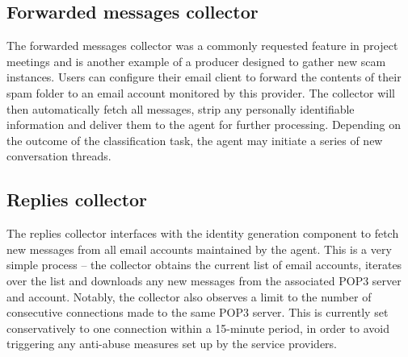 \subsection{Forwarded messages collector}
The forwarded messages collector was a commonly requested feature in project meetings and is another example of a producer designed to gather new scam instances. Users can configure their email client to forward the contents of their spam folder to an email account monitored by this provider. The collector will then automatically fetch all messages, strip any personally identifiable information and deliver them to the agent for further processing. Depending on the outcome of the classification task, the agent may initiate a series of new conversation threads.

\subsection{Replies collector}
The replies collector interfaces with the identity generation component to fetch new messages from all email accounts maintained by the agent. This is a very simple process -- the collector obtains the current list of email accounts, iterates over the list and downloads any new messages from the associated POP3 server and account.  Notably, the collector also observes a limit to the number of consecutive connections made to the same POP3 server. This is currently set conservatively to one connection within a 15-minute period, in order to avoid triggering any anti-abuse measures set up by the service providers.